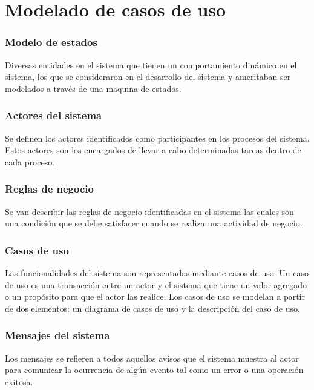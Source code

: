 \section{Modelado de casos de uso}

\subsubsection{Modelo de estados}

Diversas entidades en el sistema  que tienen un comportamiento dinámico en el sistema, 
los que se consideraron en el desarrollo del sistema y ameritaban ser modelados a través de una 
maquina de estados.\\

\subsubsection{Actores del sistema}

 Se definen los actores identificados como participantes en los procesos del sistema. 
 Estos actores son los encargados de llevar a cabo determinadas tareas dentro de cada proceso.\\
 
 \subsubsection{Reglas de negocio}

 Se van describir las reglas de negocio identificadas en el sistema las cuales son una condición que 
 se debe satisfacer cuando se realiza una actividad de negocio.\\
 
\subsubsection{Casos de uso}

Las funcionalidades del sistema son representadas mediante casos de uso. Un caso de uso es una transacción entre un actor y el sistema que tiene un valor agregado o un propósito para que el actor las realice. Los casos de uso se modelan a partir de dos elementos: un diagrama de casos de uso y la
descripción del caso de uso.\\

\subsubsection{Mensajes del sistema}

Los mensajes se refieren a todos aquellos avisos que el sistema muestra al actor para comunicar la ocurrencia de algún evento tal como un error o una operación exitosa. 

